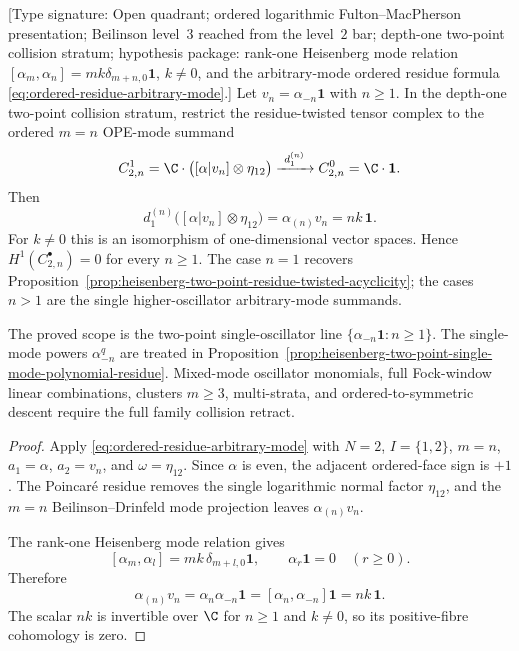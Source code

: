 \begin{proposition}
\label{prop:heisenberg-two-point-single-oscillator-residue}
\textup{[Type signature: Open quadrant; ordered logarithmic
Fulton--MacPherson presentation; Beilinson level~$3$ reached from the
level~$2$ bar; depth-one two-point collision stratum; hypothesis
package: rank-one Heisenberg mode relation
\([\alpha_m,\alpha_n]=mk\delta_{m+n,0}\mathbf1\), \(k\neq0\), and the
arbitrary-mode ordered residue formula
\eqref{eq:ordered-residue-arbitrary-mode}.]}
Let \(v_n=\alpha_{-n}\mathbf1\) with \(n\geq1\).  In the depth-one
two-point collision stratum, restrict the residue-twisted tensor
complex to the ordered \(m=n\) OPE-mode summand
\[
 C^1_{2,n}
 =
 \C\cdot\bigl([\alpha|v_n]\otimes\eta_{12}\bigr)
 \xrightarrow{\ d_1^{(n)}\ }
 C^0_{2,n}
 =
 \C\cdot\mathbf1 .
\]
Then
\[
 d_1^{(n)}\bigl([\alpha|v_n]\otimes\eta_{12}\bigr)
 =
 \alpha_{(n)}v_n
 =
 nk\,\mathbf1 .
\]
For \(k\neq0\) this is an isomorphism of one-dimensional vector
spaces.  Hence \(H^1(C^\bullet_{2,n})=0\) for every \(n\geq1\).
The case \(n=1\) recovers
Proposition~\ref{prop:heisenberg-two-point-residue-twisted-acyclicity};
the cases \(n>1\) are the single higher-oscillator
arbitrary-mode summands.

The proved scope is the two-point single-oscillator line
\(\{\alpha_{-n}\mathbf1:n\geq1\}\).  The single-mode powers
\(\alpha_{-n}^{q}\) are treated in
Proposition~\ref{prop:heisenberg-two-point-single-mode-polynomial-residue}.
Mixed-mode oscillator monomials, full Fock-window linear combinations,
clusters \(m\geq3\), multi-strata, and ordered-to-symmetric descent
require the full family collision retract.
\end{proposition}

\begin{proof}
Apply \eqref{eq:ordered-residue-arbitrary-mode} with \(N=2\),
\(I=\{1,2\}\), \(m=n\), \(a_1=\alpha\), \(a_2=v_n\), and
\(\omega=\eta_{12}\).  Since \(\alpha\) is even, the adjacent
ordered-face sign is \(+1\).  The Poincar\'e residue removes the
single logarithmic normal factor \(\eta_{12}\), and the
\(m=n\) Beilinson--Drinfeld mode projection leaves
\(\alpha_{(n)}v_n\).

The rank-one Heisenberg mode relation gives
\[
 [\alpha_m,\alpha_l]=mk\,\delta_{m+l,0}\mathbf1,
 \qquad
 \alpha_r\mathbf1=0\quad(r\geq0).
\]
Therefore
\[
 \alpha_{(n)}v_n
 =
 \alpha_n\alpha_{-n}\mathbf1
 =
 [\alpha_n,\alpha_{-n}]\mathbf1
 =
 nk\,\mathbf1 .
\]
The scalar \(nk\) is invertible over \(\C\) for \(n\geq1\) and
\(k\neq0\), so its positive-fibre cohomology is zero.
\end{proof}

